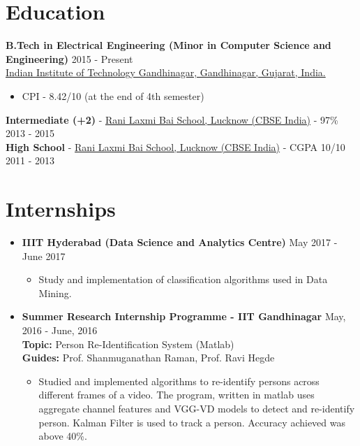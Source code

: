 \documentclass[margin, centered]{res}
\begin{document}
\begin{resume}

\section{Education}
\textbf{B.Tech in Electrical Engineering (Minor in Computer Science and Engineering)} \hfill 2015 - Present
\\
\href{http://www.iitgn.ac.in/}{Indian Institute of Technology Gandhinagar, Gandhinagar, Gujarat, India.}
\begin{itemize}
\item CPI - 8.42/10 (at the end of 4th semester)
\end{itemize}
\textbf{Intermediate (+2)} - \href{http://www.rlbschools.org/}{Rani Laxmi Bai School, Lucknow (CBSE India)} - 97\% \hfill 2013 - 2015
\\
\textbf{High School} - \href{http://www.rlbschools.org/}{Rani Laxmi Bai School, Lucknow (CBSE India)} - CGPA 10/10 \hfill 2011 - 2013


\section{Internships}
\begin{itemize}[leftmargin=*]
\item \textbf{IIIT Hyderabad (Data Science and Analytics Centre)} \hfill{May 2017 - June 2017}
\begin{itemize}[leftmargin=*]
\item Study and implementation of classification algorithms used in Data Mining.
\end{itemize}
\item \textbf{Summer Research Internship Programme - IIT Gandhinagar} \hfill May, 2016 - June, 2016
\\
{\bf Topic: }Person Re-Identification System (Matlab)
\\
{\bf Guides: }Prof. Shanmuganathan Raman, Prof. Ravi Hegde
\vspace{1mm}
\begin{itemize}[leftmargin=*]
\item Studied and implemented algorithms to re-identify persons across different frames of a video. The program, written in matlab uses aggregate channel features and VGG-VD models to detect and re-identify person. Kalman Filter is used to track a person. Accuracy achieved was above 40\%.
\end{itemize}
\end{itemize}


\end{resume}
\end{document}
